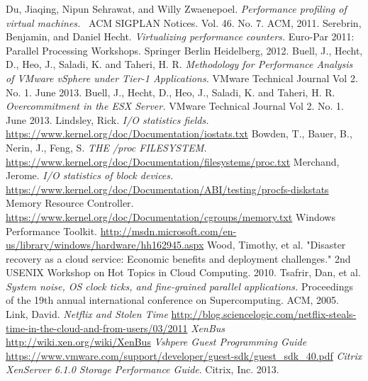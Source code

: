 \begin{thebibliography}{9}
Du, Jiaqing, Nipun Sehrawat, and Willy Zwaenepoel.  \emph{Performance profiling of virtual machines.}  ACM SIGPLAN Notices. Vol. 46. No. 7. ACM, 2011.
Serebrin, Benjamin, and Daniel Hecht.  \emph{Virtualizing performance counters.}  Euro-Par 2011: Parallel Processing Workshops. Springer Berlin Heidelberg, 2012.
Buell, J., Hecht, D., Heo, J., Saladi, K. and Taheri, H. R.  \emph{Methodology for Performance Analysis of VMware vSphere under Tier-1 Applications.}  VMware Technical Journal Vol 2. No. 1.  June 2013.
Buell, J., Hecht, D., Heo, J., Saladi, K. and Taheri, H. R.  \emph{Overcommitment in the ESX Server.}  VMware Technical Journal Vol 2. No. 1.  June 2013.
 Lindsley, Rick.  \emph{I/O statistics fields.} \url{https://www.kernel.org/doc/Documentation/iostats.txt}
 Bowden, T., Bauer, B., Nerin, J., Feng, S.  \emph{THE /proc FILESYSTEM.} \url{https://www.kernel.org/doc/Documentation/filesystems/proc.txt}
 Merchand, Jerome. \emph{I/O statistics of block devices.} \url{https://www.kernel.org/doc/Documentation/ABI/testing/procfs-diskstats}
 Memory Resource Controller. \url{https://www.kernel.org/doc/Documentation/cgroups/memory.txt}
 Windows Performance Toolkit. \url{http://msdn.microsoft.com/en-us/library/windows/hardware/hh162945.aspx}
 Wood, Timothy, et al. "Disaster recovery as a cloud service: Economic benefits and deployment challenges." 2nd USENIX Workshop on Hot Topics in Cloud Computing. 2010.
 Tsafrir, Dan, et al. \emph{System noise, OS clock ticks, and fine-grained parallel applications.} Proceedings of the 19th annual international conference on Supercomputing. ACM, 2005.
 Link, David.  \emph{Netflix and Stolen Time} \url{http://blog.sciencelogic.com/netflix-steals-time-in-the-cloud-and-from-users/03/2011} 
 \emph{XenBus} \url{http://wiki.xen.org/wiki/XenBus}
 \emph{Vshpere Guest Programming Guide} \url{https://www.vmware.com/support/developer/guest-sdk/guest\_sdk\_40.pdf}
 \emph{Citrix XenServer 6.1.0 Storage Performance Guide}.  Citrix, Inc. 2013.
\end{thebibliography}

